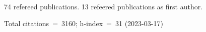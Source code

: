 74 refereed publications. 13 refeered publications as first author.

Total citations~=~3160; h-index~=~31 (2023-03-17)